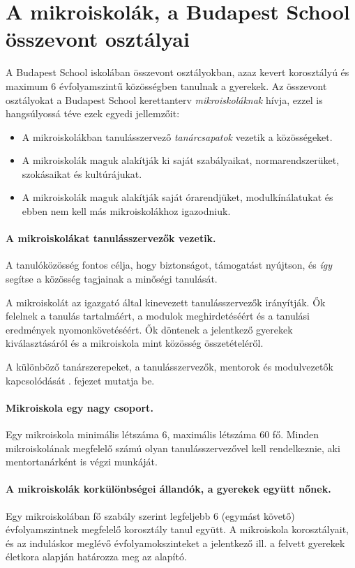 \section{A mikroiskolák, a Budapest School összevont osztályai}
\label{sec:mikroiskola}

A Budapest School iskolában összevont osztályokban, azaz kevert korosztályú és
maximum 6 évfolyamszintű közösségben tanulnak a gyerekek. Az összevont
osztályokat a Budapest School kerettanterv \emph{mikroiskoláknak} hívja, ezzel
is
hangsúlyossá téve ezek egyedi jellemzőit:
\begin{itemize}
      \item A mikroiskolákban  tanulásszervező	\emph{tanárcsapatok} vezetik a
            közösségeket.
      \item A mikroiskolák maguk alakítják ki saját szabályaikat, normarendszerüket, szokásaikat és
            kultúrájukat.
      \item A mikroiskolák maguk alakítják saját órarendjüket, modulkínálatukat
            és ebben nem kell más mikroiskolákhoz igazodniuk.
\end{itemize}

\paragraph{A mikroiskolákat tanulásszervezők vezetik.}

A tanulóközösség fontos célja, hogy biztonságot, támogatást nyújtson, és
\emph{így} segítse a közösség tagjainak a minőségi tanulását.

A mikroiskolát az igazgató által kinevezett tanulásszervezők irányítják.
Ők felelnek a tanulás tartalmáért, a modulok meghirdetéséért és a
tanulási eredmények nyomonkövetéséért. Ők döntenek a jelentkező gyerekek
kiválasztásáról és a mikroiskola mint közösség összetételéről.

A különböző tanárszerepeket, a tanulásszervezők, mentorok és modulvezetők
kapcsolódását . fejezet mutatja be.

\paragraph{Mikroiskola egy nagy csoport.}

Egy mikroiskola minimális létszáma 6, maximális létszáma 60 fő. Minden
mikroiskolának megfelelő számú olyan tanulásszervezővel kell
rendelkeznie, aki mentortanárként is végzi munkáját.

\paragraph{A mikroiskolák korkülönbségei állandók, a gyerekek együtt nőnek.}
Egy mikroiskolában fő szabály szerint legfeljebb 6 (egymást követő)
évfolyamszintnek megfelelő korosztály tanul együtt. A mikroiskola
korosztályait, és az induláskor meglévő évfolyamokszinteket a jelentkező ill. a
felvett gyerekek életkora alapján határozza meg az alapító.

